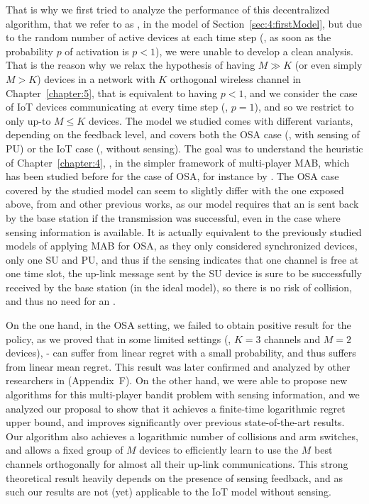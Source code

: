 That is why we first tried to analyze the performance of this decentralized algorithm, that we refer to as \Selfish, in the model of Section~\ref{sec:4:firstModel},
but due to the random number of active devices at each time step (\ie, as soon as the probability $p$ of activation is $p < 1$), we were unable to develop a clean analysis.
%
That is the reason why we relax the hypothesis of having $M \gg K$ (or even simply $M > K$) devices in a network with $K$ orthogonal wireless channel in Chapter~\ref{chapter:5}, that is equivalent to having $p < 1$, and we consider the case of IoT devices communicating at every time step (\ie, $p=1$), and so we restrict to only up-to $M \leq K$ devices.
The model we studied comes with different variants, depending on the feedback level, and covers both the OSA case (\ie, with sensing of PU) or the IoT case (\ie, without sensing).
The goal was to understand the heuristic of Chapter~\ref{chapter:4}, \Selfish, in the simpler framework of multi-player MAB, which has been studied before for the case of OSA, for instance by \cite{Zhao10,Anandkumar10,Anandkumar11}.
%
The OSA case covered by the studied model can seem to slightly differ with the one exposed above, from \cite{Jouini10} and other previous works,
as our model requires that an \Ack{} is sent back by the base station if the transmission was successful, even in the case where sensing information is available.
It is actually equivalent to the previously studied models of applying MAB for OSA, as they only considered synchronized devices, only one SU and PU, and thus if the sensing indicates that one channel is free at one time slot, the up-link message sent by the SU device is sure to be successfully received by the base station (in the ideal model), so there is no risk of collision, and thus no need for an \Ack.


On the one hand, in the OSA setting, we failed to obtain positive result for the \Selfish{} policy, as we proved that in some limited settings (\eg, $K=3$ channels and $M=2$ devices), \Selfish-\UCB{} can suffer from linear regret with a small probability, and thus suffers from linear mean regret.
This result was later confirmed and analyzed by other researchers in \cite{BoursierPerchet18} (Appendix~F).
%
On the other hand, we were able to propose new algorithms for this multi-player bandit problem with sensing information, and we analyzed our proposal \MCTopM{} to show that it achieves a finite-time logarithmic regret upper bound, and improves significantly over previous state-of-the-art results.
Our algorithm also achieves a logarithmic number of collisions and arm switches, and allows a fixed group of $M$ devices to efficiently learn to use the $M$ best channels orthogonally for almost all their up-link communications.
%
This strong theoretical result heavily depends on the presence of sensing feedback, and as such our results are not (yet) applicable to the IoT model without sensing.

